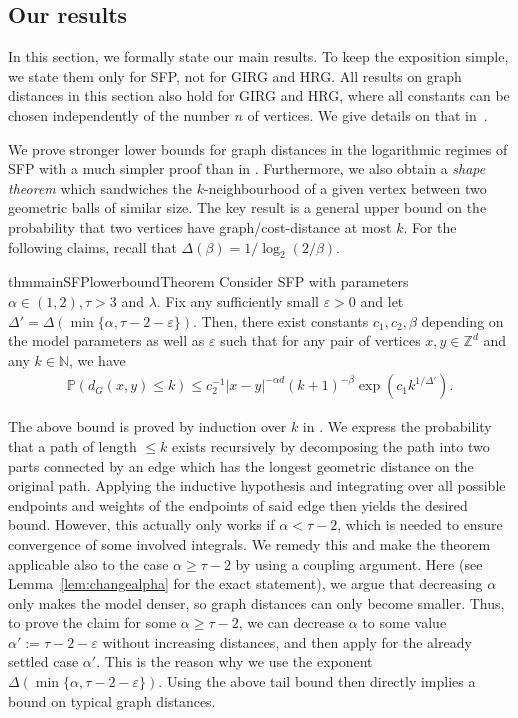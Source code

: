 \documentclass[11pt, letterpaper, margin=1in]{amsart}
\theoremstyle{definition}
\theoremstyle{remark}
\renewcommand{\Pr}[1]{\ensuremath{\mathbb{P} \left(#1 \right) }}
\newcommand{\eps}{\varepsilon}
\newcommand{\percparam}{\lambda}
\newcommand{\alphaparam}{\alpha}
\newcommand{\tauparam}{\tau}
\newcommand{\graphdist}[2]{d_{G}(#1, #2)}
\newcommand{\ceconst}{c_{1}}
\newcommand{\Cconst}{c_2}
\newcommand{\pconst}{\beta}
\newcommand{\geomdist}[2]{|#1 - #2|}
\newcommand{\hops}{k}
\numberwithin{equation}{section}
\begin{document}
\subsection{Our results}
In this section, we formally state our main results. To keep the exposition simple, we state them only for SFP, not for GIRG and HRG. All results on graph distances in this section also hold for GIRG and HRG, where all constants can be chosen independently of the number $n$ of vertices. We give details on that in~.

We prove stronger lower bounds for graph distances in the logarithmic regimes of SFP with a much simpler proof than in \cite{hao2023graph}. Furthermore, we also obtain a \emph{shape theorem} which sandwiches the $k$-neighbourhood of a given vertex between two geometric balls of similar size. The key result is a general upper bound on the probability that two vertices have graph/cost-distance at most $k$. For the following claims, recall that $\Delta(\beta) = 1/\log_2(2/\beta)$.

\begin{restatable}{thm}{mainSFPlowerboundTheorem}\label{thm:mainSFPlowerboundTheorem}
Consider SFP with parameters $\alphaparam{} \in (1, 2), \tauparam{} > 3$ and $\percparam$. 
Fix any sufficiently small $\eps > 0$ and let $\Delta' = \Delta(\min\{\alphaparam, \tauparam - 2 - \eps\})$. Then, there exist constants $\ceconst{}, \Cconst{}, \pconst{}$ depending on the model parameters as well as $\eps$ such that for any pair of vertices $x, y \in \mathbb{Z}^d$ and any $k \in \mathbb{N}$, we have
\begin{align*}
    \Pr{\graphdist{x}{y} \le \hops} \le \Cconst^{-1} \geomdist{x}{y}^{-\alphaparam d} (\hops + 1)^{-\pconst} \exp\left(\ceconst {\hops}^{1/\Delta'}\right).
\end{align*}
\end{restatable}

The above bound is proved by induction over $k$ in . We express the probability that a path of length $\le k$ exists recursively by decomposing the path into two parts connected by an edge which has the longest geometric distance on the original path. Applying the inductive hypothesis and integrating over all possible endpoints and weights of the endpoints of said edge then yields the desired bound. However, this actually only works if $\alpha < \tau - 2$, which is needed to ensure convergence of some involved integrals. We remedy this and make the theorem applicable also to the case $\alpha \ge \tau - 2$ by using a coupling argument. Here (see Lemma~\ref{lem:changealpha} for the exact statement), we argue that decreasing $\alpha$ only makes the model denser, so graph distances can only become smaller. Thus, to prove the claim for some $\alpha\ge \tau - 2$, we can decrease $\alpha$ to some value $\alpha' := \tau-2-\eps$ without increasing distances, and then apply  for the already settled case $\alpha'$. This is the reason why we use the exponent $\Delta(\min\{\alpha, \tau - 2 - \varepsilon\})$. Using the above tail bound then directly implies a bound on typical graph distances.
\end{document}

